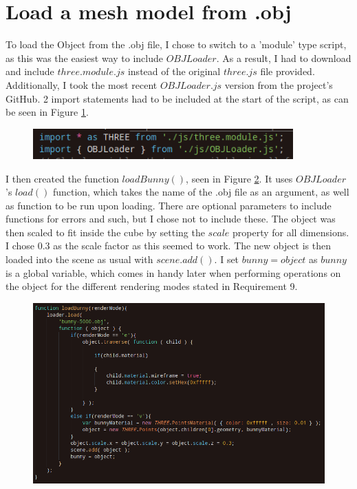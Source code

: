 \documentclass[12pt]{article}
\begin{document}
\section{Load a mesh model from .obj}
To load the Object from the .obj file, I chose to switch to a 'module' type script, as this was the easiest way to include $OBJLoader$. As a result, I had to download and include $three.module.js$ instead of the original $three.js$ file provided. Additionally, I took the most recent $OBJLoader.js$ version from the project's GitHub.
2 import statements had to be included at the start of the script, as can be seen in Figure \ref{fig:10}.
\begin{figure}[H]  
  \centering
  \includegraphics[width=10cm]{13.png}
  \caption{}
  \label{fig:10}
\end{figure}
I then created the function $loadBunny()$, seen in Figure \ref{fig:11}. It uses $OBJLoader$'s $load()$ function, which takes the name of the .obj file as an argument, as well as function to be run upon loading. There are optional parameters to include functions for errors and such, but I chose not to include these.
The object was then scaled to fit inside the cube by setting the $scale$ property for all dimensions. I chose 0.3 as the scale factor as this seemed to work. The new object is then loaded into the scene as usual with $scene.add()$. I set $bunny = object$ as $bunny$ is a global variable, which comes in handy later when performing operations on the object for the different rendering modes stated in Requirement 9.
\begin{figure}[H]  
  \centering
  \includegraphics[width=15cm]{12.png}
  \caption{}
  \label{fig:11}
\end{figure}
\end{document}
